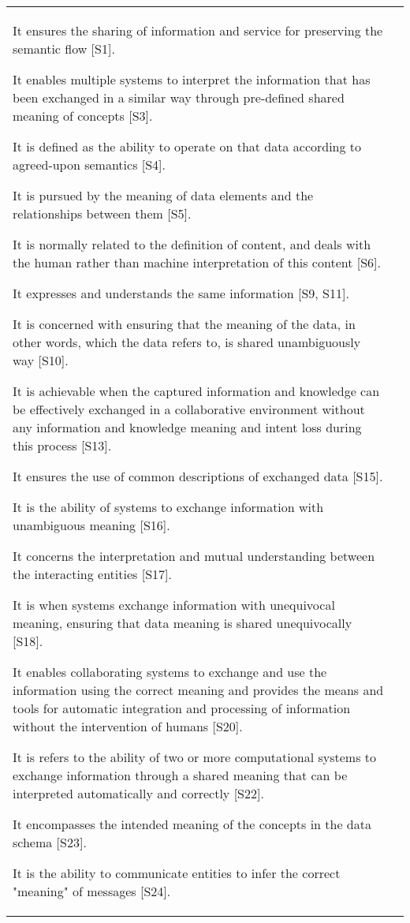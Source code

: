 \begin{longtable}{|p{2.3cm}|p{14cm}|}
    It ensures the sharing of information and service for preserving the semantic flow [S1].
    
    It enables multiple systems to interpret the information that has been exchanged in a similar way through pre-defined shared meaning of concepts [S3]. 
   
    It is defined as the ability to operate on that data according to agreed-upon semantics [S4]. 
    
    It is pursued by the meaning of data elements and the relationships between them [S5].
    
    It is normally related to the definition of content, and deals with the human rather than machine interpretation of this content [S6].
    
    It expresses and understands the same information [S9, S11].
    
    It is concerned with ensuring that the meaning of the data, in other words, which the data refers to, is shared unambiguously way [S10].
    
    It is achievable when the captured information and knowledge can be effectively exchanged in a collaborative environment without any information and knowledge meaning and intent loss during this process [S13]. 
    
    It ensures the use of common descriptions of exchanged data [S15].
    
    It is the ability of systems to exchange information with unambiguous meaning [S16].
    
    It concerns the interpretation and mutual understanding between the interacting entities [S17]. 
    
    It is when systems exchange information with unequivocal meaning, ensuring that data meaning is shared unequivocally [S18]. 
    
    It enables collaborating systems to exchange and use the information using the correct meaning and provides the means and tools for automatic integration and processing of information without the intervention of humans [S20].
    
    It is refers to the ability of two or more computational systems to exchange information through a shared meaning that can be interpreted automatically and correctly [S22].
    
    It encompasses the intended meaning of the concepts in the data schema [S23].
    
    It is the ability to communicate entities to infer the correct "meaning" of messages [S24].
     

\end{longtable}
